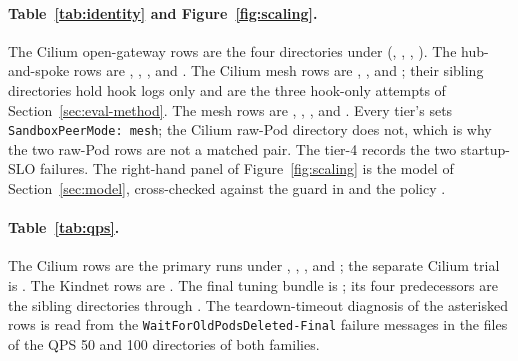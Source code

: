 \paragraph{Table~\ref{tab:identity} and Figure~\ref{fig:scaling}.}
The Cilium open-gateway rows are the four directories under
(, ,
, ). The
hub-and-spoke rows are 
, ,
, and
. The Cilium mesh rows are
,
, and
; their sibling 
directories hold hook logs only and are the three hook-only attempts of
Section~\ref{sec:eval-method}. The \sys{} mesh rows
are ,
, ,
and . Every \sys{} tier's
 sets
\texttt{SandboxPeerMode: mesh}; the Cilium raw-Pod directory
does not, which is why the two raw-Pod rows are not a matched pair. The
\sys{} tier-4  records the two startup-SLO failures. The
right-hand panel of Figure~\ref{fig:scaling} is the model of
Section~\ref{sec:model}, cross-checked against the guard in
 and the policy
.

\paragraph{Table~\ref{tab:qps}.}
The Cilium rows are the primary runs under
, , , and
; the separate Cilium trial is
. The Kindnet rows are
. The final tuning
bundle is
;
its four predecessors are the sibling directories  through
. The teardown-timeout diagnosis of the asterisked rows is read
from the \texttt{WaitForOldPodsDeleted-Final} failure messages in the
 files of the QPS 50 and 100 directories of both
families.

